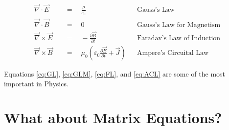 \documentclass[15pt, a4paper]{article}
\begin{document}


    
    \begin{align}
        \vec{\nabla} \cdot \vec{E} \quad &= \quad \frac{\rho}{\varepsilon_0} && \text{Gauss's Law}  \label{eq:GL} \\
        \vec{\nabla} \cdot \vec{B} \quad &= \quad 0 && \text{Gauss's Law for Magnetism} \label{eq:GLM} \\
        \vec{\nabla} \times \vec{E} \quad &= \quad -\frac{\partial\vec{B}}{\partial{t}} && \text{Faradav's Law of Induction} \label{eq:FL} \\ 
        \vec{\nabla} \times \vec{B} \quad &= \quad \mu_0\left(\varepsilon_0 \frac{\partial\vec{E}}{\partial{t}} + \vec{J}\right) && \text{Ampere's Circuital Law}  \label{eq:ACL}
    \end{align}
    
    Equations \ref{eq:GL}, \ref{eq:GLM}, \ref{eq:FL}, and \ref{eq:ACL} are some of the most important in Physics.
    
    \section{What about Matrix Equations?}
    
    
\end{document}
